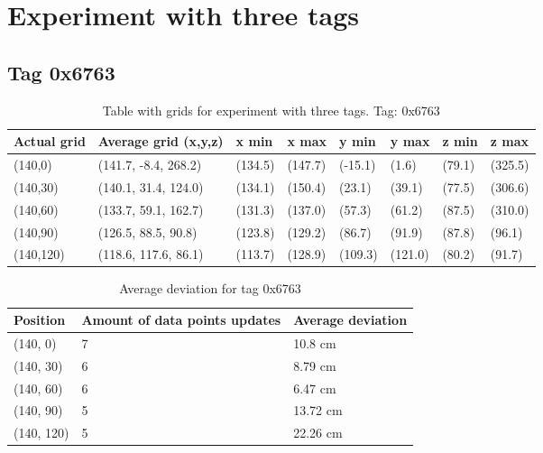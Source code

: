 \section*{Experiment with three tags}
\subsection{Tag 0x6763}
\begin{table}[H]
    \begin{tabular}{|l|l|l|l|l|l|l|l|}
        \hline
        Actual grid & Average grid (x,y,z) & x min   & x max   & y min   & y max   & z min  & z max   \\ \hline
        (140,0)     & (141.7, -8.4, 268.2) & (134.5) & (147.7) & (-15.1) & (1.6)   & (79.1) & (325.5) \\ \hline
        (140,30)    & (140.1, 31.4, 124.0) & (134.1) & (150.4) & (23.1)  & (39.1)  & (77.5) & (306.6) \\ \hline
        (140,60)    & (133.7, 59.1, 162.7) & (131.3) & (137.0) & (57.3)  & (61.2)  & (87.5) & (310.0) \\ \hline
        (140,90)    & (126.5, 88.5, 90.8)  & (123.8) & (129.2) & (86.7)  & (91.9)  & (87.8) & (96.1)  \\ \hline
        (140,120)   & (118.6, 117.6, 86.1) & (113.7) & (128.9) & (109.3) & (121.0) & (80.2) & (91.7)  \\ \hline
    \end{tabular}
    \label{Tab:three-tag-experiment-result-tag-0x6763}
    \caption{Table with grids for experiment with three tags. Tag: 0x6763}
\end{table}

\begin{table}[H]
    \centering
    \begin{tabular}{|l|l|l|}
        \hline
        Position   & Amount of data points updates & Average deviation \\ \hline
        (140, 0)   & 7                             & 10.8 cm           \\ \hline
        (140, 30)  & 6                             & 8.79 cm           \\ \hline
        (140, 60)  & 6                             & 6.47 cm           \\ \hline
        (140, 90)  & 5                             & 13.72 cm          \\ \hline
        (140, 120) & 5                             & 22.26 cm          \\ \hline
    \end{tabular}
    \caption{Average deviation for tag 0x6763}
\end{table}

